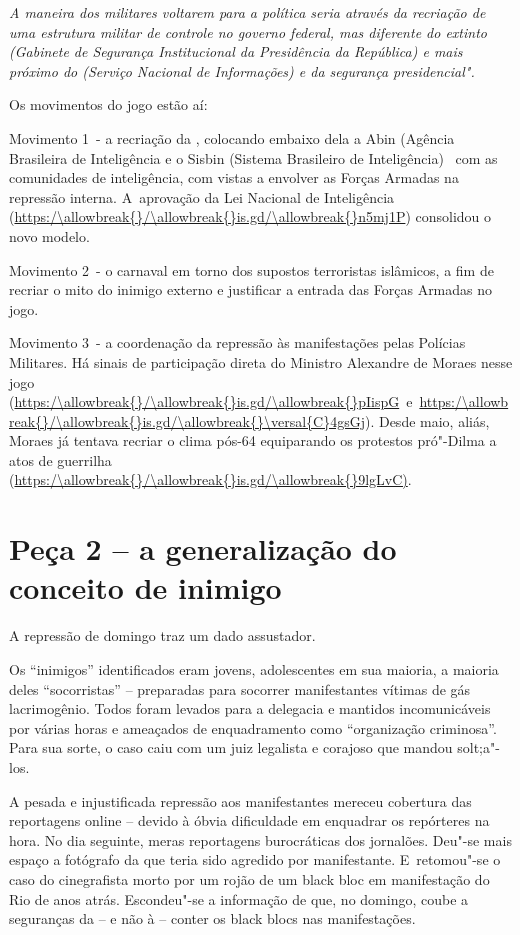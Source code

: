 \emph{\redondo{[…]} A maneira dos militares voltarem para a política
seria através da recriação de uma estrutura militar de controle no
governo federal, mas diferente do extinto  (Gabinete de Segurança
Institucional da Presidência da República) e mais próximo do 
(Serviço Nacional de Informações) e da segurança presidencial".}

Os movimentos do jogo estão aí:

Movimento 1~- a recriação da , colocando embaixo dela a Abin (Agência
Brasileira de Inteligência e o Sisbin (Sistema Brasileiro de
Inteligência)~ com as comunidades de inteligência, com vistas a envolver
as Forças Armadas na repressão interna. A~aprovação da Lei Nacional de
Inteligência (\url{https:/\allowbreak{}/\allowbreak{}is.gd/\allowbreak{}n5mj1P}) consolidou o novo modelo.

Movimento 2~- o carnaval em torno dos supostos terroristas islâmicos, a
fim de recriar o mito do inimigo externo e justificar a entrada das
Forças Armadas no jogo.

Movimento 3~- a coordenação da repressão às manifestações pelas Polícias
Militares. Há sinais de participação direta do Ministro Alexandre de
Moraes nesse jogo
(\url{https:/\allowbreak{}/\allowbreak{}is.gd/\allowbreak{}pIispG}~e~\url{https:/\allowbreak{}/\allowbreak{}is.gd/\allowbreak{}\versal{C}4gsGj}). Desde maio,
aliás, Moraes já tentava recriar o clima pós-64 equiparando os protestos
pró"-Dilma a atos de guerrilha (\url{https:/\allowbreak{}/\allowbreak{}is.gd/\allowbreak{}9lgLvC)}.

\section{Peça 2 -- a generalização do conceito de inimigo}

A repressão de domingo traz um dado assustador.

Os ``inimigos'' identificados eram jovens, adolescentes em sua maioria,
a maioria deles ``socorristas'' -- preparadas para socorrer
manifestantes vítimas de gás lacrimogênio. Todos foram levados para a
delegacia e mantidos incomunicáveis por várias horas e ameaçados de
enquadramento como ``organização criminosa''. Para sua sorte, o caso
caiu com um juiz legalista e corajoso que mandou solt;a"-los.

A pesada e injustificada repressão aos manifestantes mereceu cobertura
das reportagens online -- devido à óbvia dificuldade em enquadrar os
repórteres na hora. No dia seguinte, meras reportagens burocráticas dos
jornalões. Deu"-se mais espaço a  fotógrafo da  que teria sido
agredido por  manifestante. E~retomou"-se o caso do cinegrafista morto
por um rojão de um black bloc em manifestação do Rio de anos atrás.
Escondeu"-se a informação de que, no domingo, coube a seguranças da 
-- e não à  -- conter os black blocs nas manifestações.

